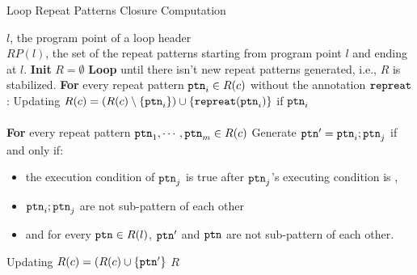 \begin{algorithm}
\caption{
{Loop Repeat Patterns Closure Computation}
\label{alg:loop-repeat-pattern}
}
\begin{algorithmic}[1]
\REQUIRE $l$, the program point of a loop header
\\ \quad
$RP(l)$, the set of the repeat patterns starting from program point $l$ and ending at $l$.
\STATE  \textbf{Init} $R = \emptyset$
\STATE  \textbf{Loop} until there isn't new repeat patterns generated, i.e., $R$ is stabilized.
\STATE  \quad \textbf{For} every repeat pattern $\mathtt{ptn}_i \in R(c)$ without the annotation $\mathtt{repreat}$:
\STATE  \quad \quad Updating $R(c) = (R(c) \setminus \{\mathtt{ptn}_{i}\}) \cup \{\mathtt{repreat}(\mathtt{ptn}_i)\}$
if $\mathtt{ptn}_i$ 
\\ \quad \quad {}
\\ \quad \quad 
{}
\STATE  \quad \textbf{For} every repeat pattern $\mathtt{ptn}_1, \cdots, \mathtt{ptn}_m \in R(c)$
\STATE \quad \quad  Generate $\mathtt{ptn}' = \mathtt{ptn}_{i}; \mathtt{ptn}_{j} $ 
if and only if:
\begin{itemize}
  \item  the execution condition of $\mathtt{ptn}_{j}$
is true after $\mathtt{ptn}_{j}$'s executing condition is , 
\item   $\mathtt{ptn}_{i}; \mathtt{ptn}_{j}$ are not sub-pattern of each other
\item  and for every $\mathtt{ptn} \in R(l)$, $\mathtt{ptn}'$ and $\mathtt{ptn}$ are not sub-pattern of each other.
\end{itemize}
\STATE  \quad \quad Updating $R(c) = (R(c) \cup \{\mathtt{ptn}'\}$
\RETURN $R$
\end{algorithmic}
\end{algorithm}
%
